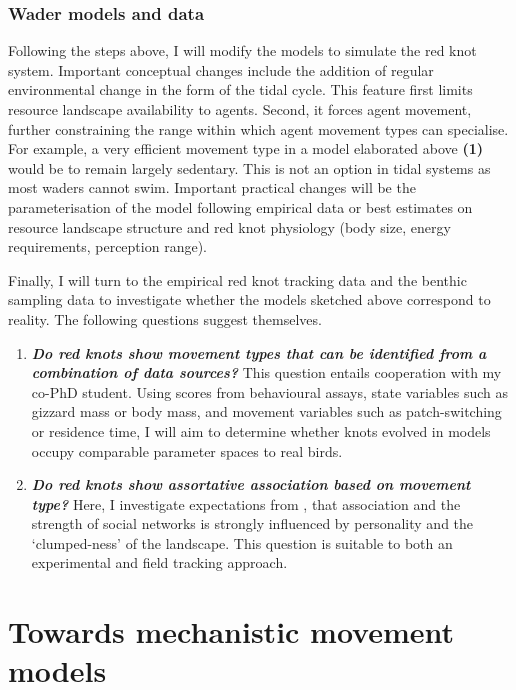 \section{Wader models and data}

Following the steps above, I will modify the models to simulate the red
knot system. Important conceptual changes include the addition of
regular environmental change in the form of the tidal cycle. This
feature first limits resource landscape availability to agents. Second,
it forces agent movement, further constraining the range within which
agent movement types can specialise. For example, a very efficient
movement type in a model elaborated above \textbf{(1)} would be to
remain largely sedentary. This is not an option in tidal systems as most
waders cannot swim. Important practical changes will be the
parameterisation of the model following empirical data or best estimates
on resource landscape structure and red knot physiology (body size,
energy requirements, perception range).

Finally, I will turn to the empirical red knot tracking data and the
benthic sampling data to investigate whether the models sketched above
correspond to reality. The following questions suggest themselves.

\begin{enumerate}
\def\labelenumi{\arabic{enumi}.}
\setcounter{enumi}{3}
\item
  \textbf{\emph{Do red knots show movement types that can be identified
  from a combination of data sources?}} This question entails
  cooperation with my co-PhD student. Using scores from behavioural
  assays, state variables such as gizzard mass or body mass, and
  movement variables such as patch-switching or residence time, I will
  aim to determine whether knots evolved in models occupy comparable
  parameter spaces to real birds.
\item
  \textbf{\emph{Do red knots show assortative association based on
  movement type?}} Here, I investigate expectations from
  \citet{spiegel2017}, that association and the strength of social
  networks is strongly influenced by personality and the `clumped-ness'
  of the landscape. This question is suitable to both an experimental
  and field tracking approach.
\end{enumerate}

\part{Towards mechanistic movement models}

